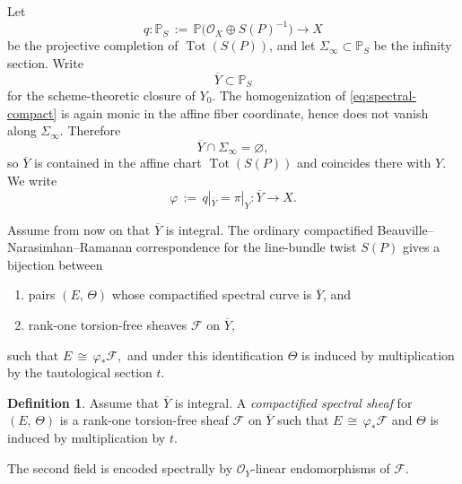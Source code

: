 \documentclass[a4paper,12pt]{amsart}
\numberwithin{equation}{section}
\theoremstyle{definition}
\newtheorem{definition}[theorem]{Definition}
\newcommand{\OO}{\mathcal{O}}
\newcommand{\cF}{\mathcal{F}}
\newcommand{\PP}{\mathbb{P}}
\newcommand{\Tot}{\operatorname{Tot}}
\begin{document}
Let
\[
q:\PP_S\,:=\,\PP\bigl(\OO_X\oplus S(P)^{-1}\bigr)\longrightarrow X
\]
be the projective completion of \(\Tot(S(P))\), and let \(\Sigma_\infty\subset \PP_S\) be the infinity section.  Write
\[
\overline{Y}\subset \PP_S
\]
for the scheme-theoretic closure of \(Y_0\).  The homogenization of \eqref{eq:spectral-compact} is again monic in the affine fiber coordinate, hence does not vanish along \(\Sigma_\infty\).  Therefore
\[
\overline{Y}\cap \Sigma_\infty=\varnothing,
\]
so \(\overline{Y}\) is contained in the affine chart \(\Tot(S(P))\) and coincides there with \(Y\).  We write
\[
\varphi\,:=\,q|_{\overline{Y}}=\pi|_Y:\overline{Y}\longrightarrow X.
\]

Assume from now on that \(\overline{Y}\) is integral.  The ordinary compactified Beauville--Narasimhan--Ramanan correspondence for the line-bundle twist \(S(P)\) gives a bijection between
\begin{enumerate}
\item[(a)] pairs \((E,\,\Theta)\) whose compactified spectral curve is \(\overline{Y}\), and
\item[(b)] rank-one torsion-free sheaves \(\cF\) on \(\overline{Y}\),
\end{enumerate}
such that
\(
E\,\cong\, \varphi_*\cF,
\)
and under this identification \(\Theta\) is induced by multiplication by the tautological section \(t\).

\begin{definition}\label{def:compactified-sheaf}
Assume that \(\overline{Y}\) is integral.  A \emph{compactified spectral sheaf} for \((E,\,\Theta)\) is a rank-one torsion-free sheaf \(\cF\) on \(\overline{Y}\) such that \(E\,\cong\, \varphi_*\cF\) and \(\Theta\) is induced by multiplication by \(t\).
\end{definition}

The second field is encoded spectrally by \(\OO_{\overline{Y}}\)-linear endomorphisms of \(\cF\).
\end{document}
